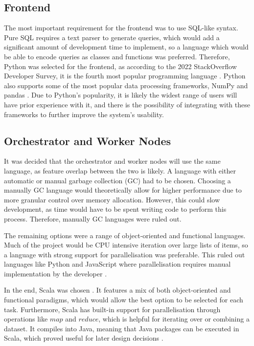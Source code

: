 \subsection{Frontend}\label{subsec:frontend-design}
The most important requirement for the frontend was to use SQL-like syntax. Pure SQL requires a text parser to generate queries, which would add a significant amount of development time to implement, so a language which would be able to encode queries as classes and functions was preferred. Therefore, Python was selected for the frontend, as according to the 2022 StackOverflow Developer Survey, it is the fourth most popular programming language \cite{stackoverflowsurvey2022}. Python also supports some of the most popular data processing frameworks, NumPy and pandas \cite{reback2020pandas, harris2020array}. Due to Python's popularity, it is likely the widest range of users will have prior experience with it, and there is the possibility of integrating with these frameworks to further improve the system's usability. 

\subsection{Orchestrator and Worker Nodes}
It was decided that the orchestrator and worker nodes will use the same language, as feature overlap between the two is likely. A language with either automatic or manual garbage collection (GC) had to be chosen. Choosing a manually GC language would theoretically allow for higher performance due to more granular control over memory allocation. However, this could slow development, as time would have to be spent writing code to perform this process. Therefore, manually GC languages were ruled out.

The remaining options were a range of object-oriented and functional languages. Much of the project would be CPU intensive iteration over large lists of items, so a language with strong support for parallelisation was preferable. This ruled out languages like Python and JavaScript where parallelisation requires manual implementation by the developer \cite{pythonmultiprocessing, nodeworkerthreads}.

In the end, Scala was chosen \cite{scaladocs}. It features a mix of both object-oriented and functional paradigms, which would allow the best option to be selected for each task. Furthermore, Scala has built-in support for parallelisation through operations like $map$ and $reduce$, which is  helpful for iterating over or combining a dataset. It compiles into Java, meaning that Java packages can be executed in Scala, which proved useful for later design decisions \cite{scalaforjavadevs}.
 
